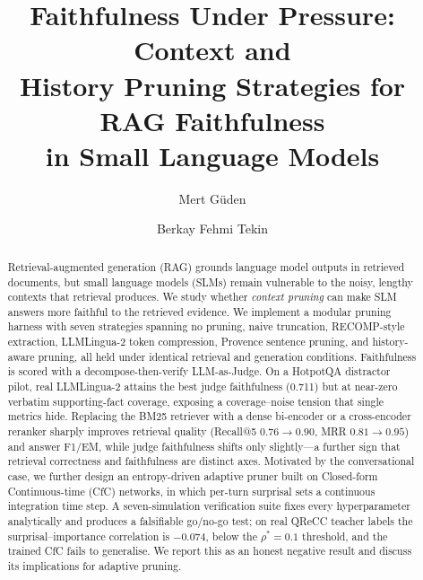 \documentclass[runningheads]{llncs}
\begin{document}
%
\title{Faithfulness Under Pressure: Context and\\ History Pruning Strategies for RAG Faithfulness\\ in Small Language Models}
%
%
\author{Mert G\"{u}den \and Berkay Fehmi Tekin}
%
%
%
\maketitle
%
\begin{abstract}
Retrieval-augmented generation (RAG) grounds language model outputs in
retrieved documents, but small language models (SLMs) remain vulnerable to
the noisy, lengthy contexts that retrieval produces. We study whether
\emph{context pruning} can make SLM answers more faithful to the retrieved
evidence. We implement a modular pruning harness with seven strategies
spanning no pruning, naive truncation, RECOMP-style extraction, LLMLingua-2
token compression, Provence sentence pruning, and history-aware pruning, all
held under identical retrieval and generation conditions. Faithfulness is
scored with a decompose-then-verify LLM-as-Judge. On a HotpotQA distractor
pilot, real LLMLingua-2 attains the best judge faithfulness (0.711) but at
near-zero verbatim supporting-fact coverage, exposing a coverage--noise
tension that single metrics hide. Replacing the BM25 retriever with a dense
bi-encoder or a cross-encoder reranker sharply improves retrieval quality
(Recall@5 $0.76\!\to\!0.90$, MRR $0.81\!\to\!0.95$) and answer F1/EM, while judge
faithfulness shifts only slightly---a further sign that retrieval correctness
and faithfulness are distinct axes. Motivated by the conversational case, we
further design an entropy-driven adaptive pruner built on Closed-form
Continuous-time (CfC) networks, in which per-turn surprisal sets a continuous
integration time step. A seven-simulation verification suite fixes every
hyperparameter analytically and produces a falsifiable go/no-go test; on real
QReCC teacher labels the surprisal--importance correlation is
$-0.074$, below the $\rho^{*}=0.1$ threshold, and the trained CfC fails to
generalise. We report this as an honest negative result and discuss its
implications for adaptive pruning.
\end{abstract}
%
\end{document}
